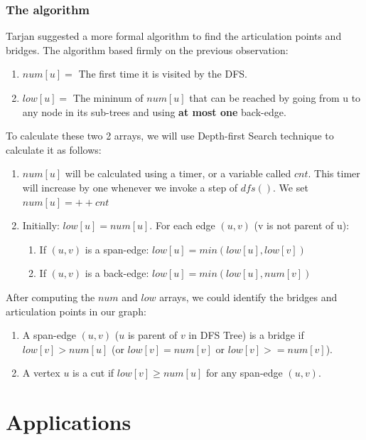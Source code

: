 \documentclass{article}
\begin{document}
\subsubsection{The algorithm}
Tarjan suggested a more formal algorithm to find the articulation points and bridges. The algorithm based firmly on the previous observation:

\begin{enumerate}[$\bullet$]
    \item $num[u] =$ The first time it is visited by the DFS.
    \item $low[u] =$ The mininum of $num[u]$ that can be reached by going from u to any node in its sub-trees and using \textbf{at most one} back-edge.
\end{enumerate}

To calculate these two 2 arrays, we will use Depth-first Search technique to calculate it as follows:

\begin{enumerate}[$\bullet$]
    \item $num[u]$ will be calculated using a timer, or a variable called $cnt$. This timer will increase by one whenever we invoke a step of $dfs()$. We set $num[u] = ++cnt$
    \item Initially: $low[u] = num[u]$. For each edge $(u, v)$ (v is not parent of u):
    \begin{enumerate}
        \item If $(u, v)$ is a span-edge: $low[u] = min(low[u], low[v])$
        \item If $(u, v)$ is a back-edge: $low[u] = min(low[u], num[v])$
    \end{enumerate}
\end{enumerate}

After computing the $num$ and $low$ arrays, we could identify the bridges and articulation points in our graph:

\begin{claim}
    \begin{enumerate}[$\bullet$]
        \item A span-edge $(u, v)$ ($u$ is parent of $v$ in DFS Tree) is a bridge if $low[v] > num[u]$ (or $low[v] = num[v]$ or $low[v] >= num[v]$).
        \item A vertex $u$ is a cut if $low[v] \geq num[u]$ for any span-edge $(u, v)$.
    \end{enumerate}
\end{claim}


\section{Applications}
\end{document}
